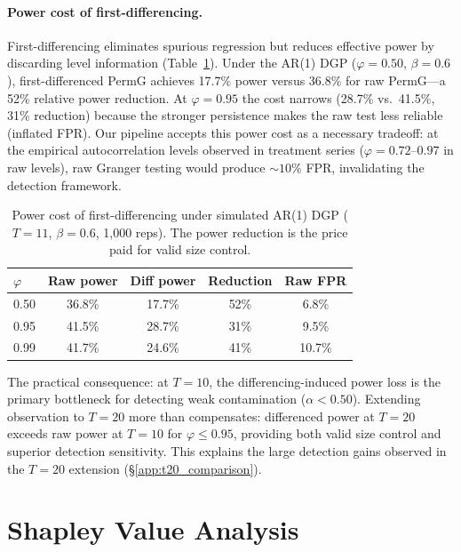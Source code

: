 \paragraph{Power cost of first-differencing.}
First-differencing eliminates spurious regression but reduces effective power by discarding level information (Table~\ref{tab:diff_power_cost}).
Under the AR(1) DGP ($\varphi{=}0.50$, $\beta{=}0.6$), first-differenced PermG achieves 17.7\% power versus 36.8\% for raw PermG---a 52\% relative power reduction.
At $\varphi{=}0.95$ the cost narrows (28.7\% vs.\ 41.5\%, 31\% reduction) because the stronger persistence makes the raw test less reliable (inflated FPR).
Our pipeline accepts this power cost as a necessary tradeoff: at the empirical autocorrelation levels observed in treatment series ($\varphi{=}0.72$--$0.97$ in raw levels), raw Granger testing would produce ${\sim}10\%$ FPR, invalidating the detection framework.

\begin{table}[H]
\centering
\small
\caption{Power cost of first-differencing under simulated AR(1) DGP ($T{=}11$, $\beta{=}0.6$, 1{,}000 reps). The power reduction is the price paid for valid size control.}
\label{tab:diff_power_cost}
\begin{tabular}{lcccc}
\toprule
$\varphi$ & Raw power & Diff power & Reduction & Raw FPR \\
\midrule
0.50 & 36.8\% & 17.7\% & 52\% & 6.8\% \\
0.95 & 41.5\% & 28.7\% & 31\% & 9.5\% \\
0.99 & 41.7\% & 24.6\% & 41\% & 10.7\% \\
\bottomrule
\end{tabular}
\end{table}

The practical consequence: at $T{=}10$, the differencing-induced power loss is the primary bottleneck for detecting weak contamination ($\alpha < 0.50$).
Extending observation to $T{=}20$ more than compensates: differenced power at $T{=}20$ exceeds raw power at $T{=}10$ for $\varphi \leq 0.95$, providing both valid size control and superior detection sensitivity.
This explains the large detection gains observed in the $T{=}20$ extension (\S\ref{app:t20_comparison}).


\section{Shapley Value Analysis}
\label{app:shapley}

